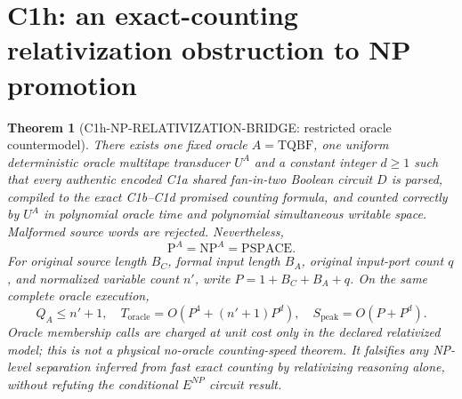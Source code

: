 \documentclass[11pt]{article}
\newtheorem{theorem}{Theorem}
\begin{document}
\section{C1h: an exact-counting relativization obstruction to NP promotion}
\begin{theorem}[C1h-NP-RELATIVIZATION-BRIDGE: restricted oracle countermodel]
There exists one fixed oracle $A=\mathrm{TQBF}$, one uniform
deterministic oracle multitape transducer $U^A$ and a constant
integer $d\ge1$ such that \emph{every} authentic encoded C1a
shared fan-in-two Boolean circuit $D$ is parsed, compiled to the
exact C1b--C1d promised counting formula, and counted correctly
by $U^A$ in polynomial oracle time and polynomial simultaneous
writable space. Malformed source words are rejected. Nevertheless,
\[
\mathrm{P}^{A}=\mathrm{NP}^{A}=\mathrm{PSPACE}.
\]
For original source length $B_C$, formal input length $B_A$,
original input-port count $q$, and normalized variable count $n'$,
write $P=1+B_C+B_A+q$. On the \emph{same complete oracle execution},
\[
Q_A\le n'+1,\quad
T_{\mathrm{oracle}}=O(P^4+(n'+1)P^d),\quad
S_{\mathrm{peak}}=O(P+P^d).
\]
Oracle membership calls are charged at unit cost \emph{only in the
declared relativized model}; this is not a physical no-oracle
counting-speed theorem. It falsifies any NP-level separation
inferred from fast exact counting by \emph{relativizing reasoning
alone}, without refuting the conditional $E^{NP}$ circuit result.
\end{theorem}
\end{document}
